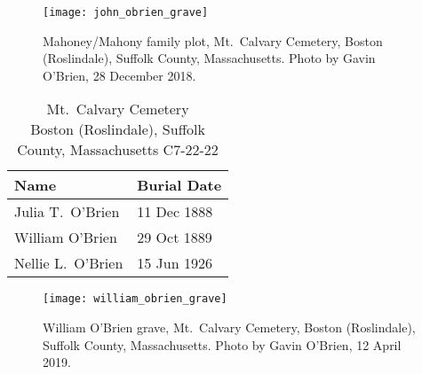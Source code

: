 \begin{figure}
	\centering
	\texttt{[image: john\_obrien\_grave]}
	\caption{Mahoney/Mahony family plot, Mt.\ Calvary Cemetery, Boston (Roslindale), Suffolk County, Massachusetts. Photo by Gavin O'Brien, 28 December 2018.}
\end{figure}

\begin{table}[ht]
	\centering
	\caption{Mt.\ Calvary Cemetery\cite{William3OBrienBurial} \\
		Boston (Roslindale), Suffolk County, Massachusetts
		C7-22-22}
	\begin{tabular}{|l|l|}
		\hline
		\textbf{Name} & \textbf{Burial Date} \\
		\hline
		Julia T.\ O'Brien\index{McCarty!Julia T.}\index{O'Brien!Julia T.\ (McCarty)} & 11 Dec 1888 \\
		\hline
		William O'Brien\index{O'Brien!William\textsuperscript{3}} & 29 Oct 1889 \\
		\hline
		Nellie L.\ O'Brien\index{O'Brien!Ellen/Nellie Louise\textsuperscript{4}} & 15 Jun 1926 \\
		\hline
	\end{tabular}
\end{table}

\begin{figure}
	\centering
	\texttt{[image: william\_obrien\_grave]}
	\caption{William O'Brien grave, Mt.\ Calvary Cemetery, Boston (Roslindale), Suffolk County, Massachusetts. Photo by Gavin O'Brien, 12 April 2019.}
\end{figure}
